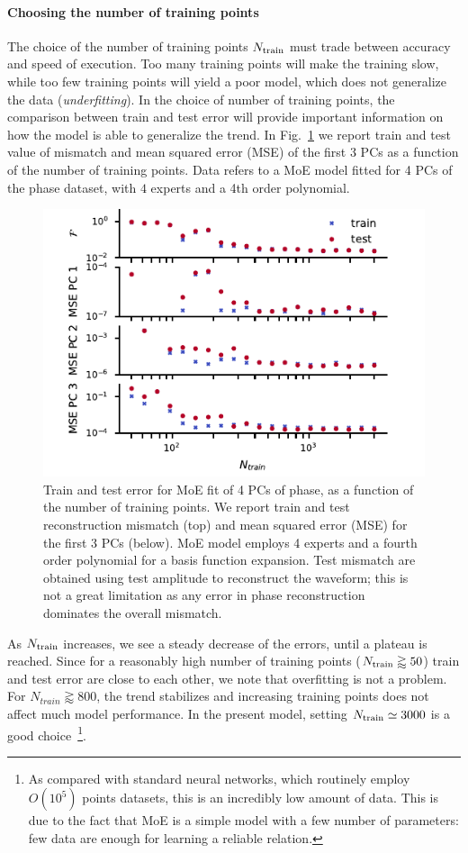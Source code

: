 \documentclass[twocolumn,showpacs,preprintnumbers,nofootinbib,prd,
superscriptaddress,10pt]{revtex4-1}
\begin{document}
\paragraph{Choosing the number of training points}
\label{par:N_train}
The choice of the number of training points $N_{\rm train}$ must trade between accuracy and speed of execution. 
Too many training points will make the training slow, while too few training points will yield a poor model, which does 
not generalize the data ({\it underfitting}). In the choice of number of training points, the comparison between train and 
test error will provide important information on how the model is able to generalize the trend.
In Fig.~\ref{fig:N_train} we report train and test value of mismatch and mean squared error (MSE) of the 
first 3 PCs as a function of the number of training points. Data refers to a MoE model fitted for 4 PCs of the phase dataset, with $4$ experts and a 4th order polynomial. 
\begin{figure}
	\centering
    \includegraphics[width=\linewidth]{img/N_train.pdf}
	\caption{Train and test error for MoE fit of 4 PCs of phase, as a function of the number of training points. 
	We report train and test reconstruction mismatch (top) and mean squared error (MSE) for the first 3 PCs (below). 
	MoE model employs 4 experts and a fourth order polynomial for a basis function expansion. Test mismatch are obtained using 
	test amplitude to reconstruct the waveform; this is not a great limitation as any error in phase reconstruction dominates the overall mismatch.
    }
	\label{fig:N_train}
\end{figure}
%
As $N_{\rm train}$ increases, we see a steady decrease of the errors, until a plateau is reached.
Since for a reasonably high number of training points ($N_{\rm train} \gtrapprox 50$) train and test error 
are close to each other, we note that overfitting is not a problem.
For $N_{train} \gtrapprox 800$, the trend stabilizes and increasing training points 
does not affect much model performance. In the present model, setting $N_{\rm train} \simeq \SI{3000}{}$ 
is a good choice~\footnote{As compared with standard neural networks, which routinely employ $O(10^5)$ 
points datasets, this is an incredibly low amount of data. This is due to the fact that MoE is a simple 
model with a few number of parameters: few data are enough for learning a reliable relation.}.
\end{document}
